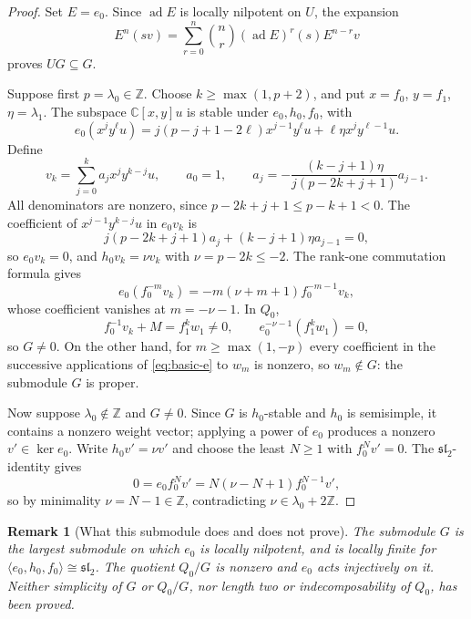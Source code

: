 \documentclass[11pt,a4paper]{article}
\newcommand{\C}{\mathbb C}
\newcommand{\Z}{\mathbb Z}
\newcommand{\slc}{\mathfrak{sl}_2}
\newcommand{\ad}{\operatorname{ad}}
\theoremstyle{plainupright}
\newtheorem{remark}[proposition]{Remark}
\begin{document}
\begin{proof}
Set \(E=e_0\). Since \(\ad E\) is locally nilpotent on \(U\), the expansion
\[
E^n(sv)=\sum_{r=0}^n\binom nr(\ad E)^r(s)E^{n-r}v
\]
proves \(UG\subseteq G\).

Suppose first \(p=\lambda_0\in\Z\). Choose \(k\ge\max(1,p+2)\), and put
\(x=f_0\), \(y=f_1\), \(\eta=\lambda_1\). The subspace \(\C[x,y]u\) is stable
under \(e_0,h_0,f_0\), with
\begin{equation}\label{eq:polynomial-e}
e_0(x^jy^\ell u)
=j(p-j+1-2\ell)x^{j-1}y^\ell u+\ell\eta x^jy^{\ell-1}u.
\end{equation}
Define
\begin{equation}\label{eq:highest-vector}
v_k=\sum_{j=0}^k a_jx^jy^{k-j}u,\qquad a_0=1,\qquad
a_j=-\frac{(k-j+1)\eta}{j(p-2k+j+1)}a_{j-1}.
\end{equation}
All denominators are nonzero, since \(p-2k+j+1\le p-k+1<0\). The coefficient
of \(x^{j-1}y^{k-j}u\) in \(e_0v_k\) is
\[
j(p-2k+j+1)a_j+(k-j+1)\eta a_{j-1}=0,
\]
so \(e_0v_k=0\), and \(h_0v_k=\nu v_k\) with \(\nu=p-2k\le-2\). The rank-one
commutation formula gives
\[
e_0(f_0^{-m}v_k)=-m(\nu+m+1)f_0^{-m-1}v_k,
\]
whose coefficient vanishes at \(m=-\nu-1\). In \(Q_0\),
\[
f_0^{-1}v_k+M=f_1^kw_1\ne0,\qquad
e_0^{-\nu-1}(f_1^kw_1)=0,
\]
so \(G\ne0\). On the other hand, for \(m\ge\max(1,-p)\) every coefficient in
the successive applications of \eqref{eq:basic-e} to \(w_m\) is nonzero, so
\(w_m\notin G\): the submodule \(G\) is proper.

Now suppose \(\lambda_0\notin\Z\) and \(G\ne0\). Since \(G\) is \(h_0\)-stable
and \(h_0\) is semisimple, it contains a nonzero weight vector; applying a
power of \(e_0\) produces a nonzero \(v'\in\ker e_0\). Write \(h_0v'=\nu v'\)
and choose the least \(N\ge1\) with \(f_0^Nv'=0\). The \(\slc\)-identity gives
\[
0=e_0f_0^Nv'=N(\nu-N+1)f_0^{N-1}v',
\]
so by minimality \(\nu=N-1\in\Z\), contradicting \(\nu\in\lambda_0+2\Z\).
\end{proof}

\begin{remark}[What this submodule does and does not prove]\label{rem:G}
The submodule \(G\) is the largest submodule on which \(e_0\) is locally
nilpotent, and is locally finite for
\(\langle e_0,h_0,f_0\rangle\cong\slc\). The quotient \(Q_0/G\) is nonzero
and \(e_0\) acts injectively on it. Neither simplicity of \(G\) or \(Q_0/G\),
nor length two or indecomposability of \(Q_0\), has been proved.
\end{remark}
\end{document}
